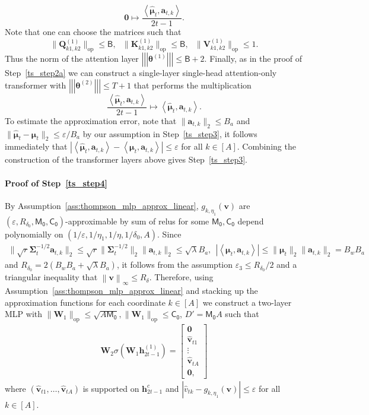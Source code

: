 \documentclass[10pt]{article}
\renewcommand{\hat}{\widehat}
\newcommand{\eps}{\varepsilon}
\newcommand{\norm}[1]{\left\|{#1}\right\|}
\newcommand{\lops}[1]{\|{#1}\|_{\mathrm{op}}}
\newcommand{\linf}[1]{\norm{#1}_\infty}
\newcommand{\<}{\left\langle}
\renewcommand{\>}{\right\rangle}
\renewcommand{\bQ}{\mathbf{Q}}
\newcommand{\bzero}{{\mathbf 0}}
\newcommand{\nrmp}[1]{{\left|\!\left|\!\left|{#1}\right|\!\right|\!\right|}}
\newcommand{\Tpsmean}{{{\mathbf\mu}}}
\newcommand{\Tpscov}{{{\mathbf\Sigma}}}
\newcommand{\Tpsparn}{{r}}
\newcommand{\trunprob}{{\eta_1}}
\newcommand{\Trunregp}{{\eta}}
\newcommand{\bigvec}{{\mathbf{v}}}
\newcommand{\tfthres}{{\mathsf{B}}}
\newcommand{\neuron}{{\mathsf{M_0}}}
\newcommand{\weightn}{{{\mathsf{C_0}}}}
\def\bK{{\mathbf K}}
\def\bQ{{\mathbf Q}}
\def\bV{{\mathbf V}}
\def\bW{{\mathbf W}}
\def\btheta{{\boldsymbol \theta}}
\def\ba{{\mathbf a}}
\def\bh{{\mathbf h}}
\def\bv{{\mathbf v}}
\begin{document}
$$
\bzero\mapsto\frac{\<\widehat\Tpsmean_t,\ba_{t,k}\>}{2t-1}.
$$ Note that one can choose the matrices such that
$$\lops{\bQ^{(1)}_{k1,k2}}\leq \tfthres,~~~\lops{\bK^{(1)}_{k1,k2}}\leq \tfthres,~~~\lops{\bV^{(1)}_{k1,k2}}\leq1.$$ Thus the norm of the attention layer  $\nrmp{\btheta^{(1)}}\leq \tfthres+2$.
Finally, as in the proof of Step~\ref{ts_step2a} we can construct a single-layer  single-head  attention-only transformer with $\nrmp{\btheta^{(2)}}\leq T+1$ that performs the multiplication
$$
\frac{\<\widehat\Tpsmean_t,\ba_{t,k}\>}{2t-1}\mapsto{\<\widehat\Tpsmean_t,\ba_{t,k}\>}.
$$
 To estimate the approximation error, note that $\|\ba_{t,k}\|_2\leq B_a$ and $\|\hat\Tpsmean_t-\Tpsmean_t\|_2\leq\eps/B_a$ by our assumption in Step~\ref{ts_step3}, it follows immediately that $|\<\widehat\Tpsmean_t,\ba_{t,k}\>-\<\Tpsmean_t,\ba_{t,k}\>|\leq\eps$ for all $k\in[A]$. Combining the construction of the transformer layers above gives Step~\ref{ts_step3}.
\paragraph{Proof of Step~\ref{ts_step4}}
By Assumption~\ref{ass:thompson_mlp_approx_linear},  $g_{k,\trunprob}(\bigvec)$ are $(\eps,R_{\delta_0}, \neuron,\weightn)$-approximable by sum of relus for some $ \neuron,\weightn$ depend polynomially on $(1/\eps,1/\trunprob,1/\Trunregp,1/\delta_0,A)$. Since
\begin{align*}
\|\sqrt{\Tpsparn}\Tpscov_t^{-1/2}\ba_{t,k}\|_2\leq \sqrt{\Tpsparn}\|\Tpscov_t^{-1/2}\|_2\|\ba_{t,k}\|_2\leq\sqrt{\lambda}B_a,~~|\<\Tpsmean_t,\ba_{t,k}\>|\leq \|\Tpsmean_t\|_2\|\ba_{t,k}\|_2=B_wB_a
\end{align*}
and $R_{\delta_0}=2(B_wB_a+\sqrt{\lambda}B_a)$, it follows from
the assumption  $\eps_3\leq R_{\delta_0}/2$ and  a triangular inequality that $\linf{\bv}\leq R_\delta$. Therefore, using Assumption~\ref{ass:thompson_mlp_approx_linear} and stacking up the approximation functions for each coordinate $k\in[A]$ we construct a two-layer MLP with $\lops{\bW_1}\leq \sqrt{A\neuron},\lops{\bW_1}\leq \weightn$, $D'= \neuron A$ such that
\begin{align*}\bW_2\sigma(\bW_1\bh^{(1)}_{2t-1})=\begin{bmatrix}
    \bzero\\\hat \bv_{t1}\\\vdots\\\hat\bv_{tA}\\\bzero,
\end{bmatrix}
\end{align*}
where $(\hat \bv_{t1},\ldots,\hat\bv_{tA})$ is supported on $\bh^c_{2t-1}$ and $|\hat v_{tk}-g_{k,\trunprob}(\bigvec)|\leq \eps$ for all $k\in[A]$.
\end{document}

